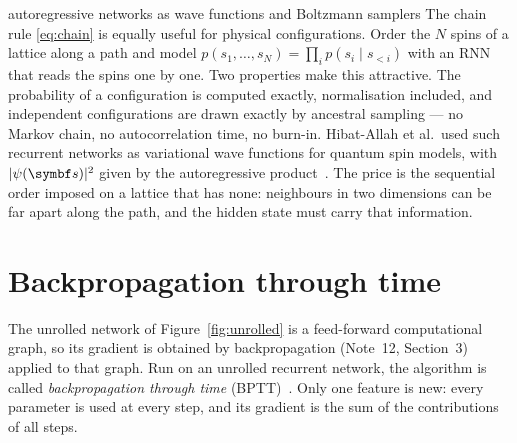 \documentclass[11pt]{article}
\begin{document}
\begin{physics}{autoregressive networks as wave functions and Boltzmann samplers}
The chain rule \eqref{eq:chain} is equally useful for physical configurations. Order the $N$ spins of a lattice along a
path and model $p(s_1, \dots, s_N) = \prod_i p(s_i \mid s_{<i})$ with an RNN that reads the spins one by one. Two
properties make this attractive. The probability of a configuration is computed exactly, normalisation included, and
independent configurations are drawn exactly by ancestral sampling --- no Markov chain, no autocorrelation time, no
burn-in. Hibat-Allah et al.\ used such recurrent networks as variational wave functions for quantum spin models, with
$|\psi(\vect{s})|^2$ given by the autoregressive product~\cite{hibatallah2020}. The price is the sequential order
imposed on a lattice that has none: neighbours in two dimensions can be far apart along the path, and the hidden
state must carry that information.
\end{physics}

\section{Backpropagation through time}\label{sec:bptt}

The unrolled network of Figure~\ref{fig:unrolled} is a feed-forward computational graph, so its gradient is obtained by
backpropagation (Note~12, Section~3) applied to that graph. Run on an unrolled recurrent network, the algorithm is called
\emph{backpropagation through time} (BPTT)~\cite{werbos1990,rumelhart1986}. Only one feature is new: every parameter
is used at every step, and its gradient is the sum of the contributions of all steps.
\end{document}
